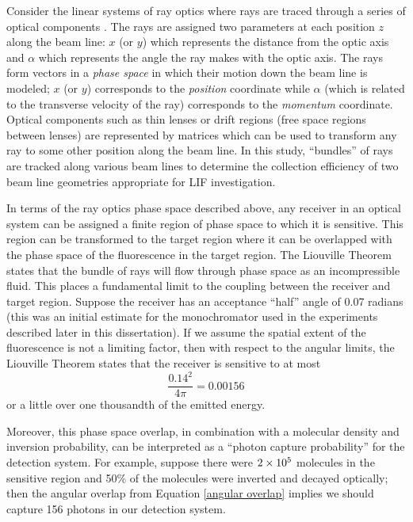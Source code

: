 Consider the linear systems of ray optics where rays are traced through a series of optical components \cite{Saleh:1991a}. The rays are assigned two parameters at each position $z$ along the beam line: $x$ (or $y$) which represents the distance from the optic axis and $\alpha$ which represents the angle the ray makes with the optic axis. The rays form vectors in a \emph{phase space} in which their motion down the beam line is modeled; $x$ (or $y$) corresponds to the \emph{position} coordinate while $\alpha$ (which is related to the transverse velocity of the ray) corresponds to the \emph{momentum} coordinate. Optical components such as thin lenses or drift regions (free space regions between lenses) are represented by matrices which can be used to transform any ray to some other position along the beam line. In this study, ``bundles'' of rays are tracked along various beam lines to determine the collection efficiency of two beam line geometries appropriate for LIF investigation.

In terms of the ray optics phase space described above, any receiver in an optical system can be assigned a finite region of phase space to which it is sensitive. This region can be transformed to the target region where it can be overlapped with the phase space of the fluorescence in the target region. The Liouville Theorem \cite{Hassani:1999a} states that the bundle of rays will flow through phase space as an incompressible fluid. This places a fundamental limit to the coupling between the receiver and target region. Suppose the receiver has an acceptance ``half'' angle of 0.07 radians (this was an initial estimate for the monochromator used in the experiments described later in this dissertation). If we assume the spatial extent of the fluorescence is not a limiting factor, then with respect to the angular limits, the Liouville Theorem states that the receiver is sensitive to at most
\begin{equation}
\frac{0.14^2}{4\pi}
=
0.00156
\label{angular overlap}
\end{equation}
or a little over one thousandth of the emitted energy.

Moreover, this phase space overlap, in combination with a molecular density and inversion probability, can be interpreted as a ``photon capture probability'' for the detection system. For example, suppose there were $2\times10^5$ molecules in the sensitive region and 50\% of the molecules were inverted and decayed optically; then the angular overlap from Equation \ref{angular overlap} implies we should capture 156 photons in our detection system.
